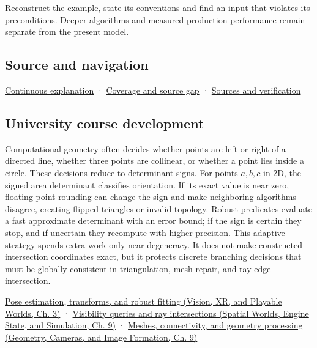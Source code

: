 Reconstruct the example, state its conventions and find an input that violates its preconditions. Deeper algorithms and measured production performance remain separate from the present model.

\subsection{Source and navigation}\label{appendix-da478be01d02-source-and-navigation}

\hyperref[01-foundations-i-ch018-keep-the-promises-visible-while-moving-between-representations]{Continuous explanation} · \hyperref[appendix-fd090d982a15-phase-7---parts-601-700]{Coverage and source gap} · \hyperref[appendix-a103e7846d21-phase-7---source-analysis-and-verification]{Sources and verification}

\subsection{University course development}\label{appendix-da478be01d02-university-course-development}

Computational geometry often decides whether points are left or right of a directed line, whether three points are collinear, or whether a point lies inside a circle. These decisions reduce to determinant signs. For points \(a,b,c\) in 2D, the signed area determinant classifies orientation. If its exact value is near zero, floating-point rounding can change the sign and make neighboring algorithms disagree, creating flipped triangles or invalid topology. Robust predicates evaluate a fast approximate determinant with an error bound; if the sign is certain they stop, and if uncertain they recompute with higher precision. This adaptive strategy spends extra work only near degeneracy. It does not make constructed intersection coordinates exact, but it protects discrete branching decisions that must be globally consistent in triangulation, mesh repair, and ray-edge intersection.

\href{../07-Vision-XR-and-Playable-Worlds/main.pdf\#nameddest=04-visual-computing-ii-ch032-pose-estimation-transforms-and-robust-fitting}{Pose estimation, transforms, and robust fitting (Vision, XR, and Playable Worlds, Ch. 3)} · \href{../05-Spatial-Worlds-Engine-State-and-Simulation/main.pdf\#nameddest=04-visual-computing-ii-ch028-visibility-queries-and-ray-intersections-1}{Visibility queries and ray intersections (Spatial Worlds, Engine State, and Simulation, Ch. 9)} · \href{../03-Geometry-Cameras-and-Image-Formation/main.pdf\#nameddest=03-visual-computing-i-ch002-meshes-connectivity-and-geometry-processing}{Meshes, connectivity, and geometry processing (Geometry, Cameras, and Image Formation, Ch. 9)}
